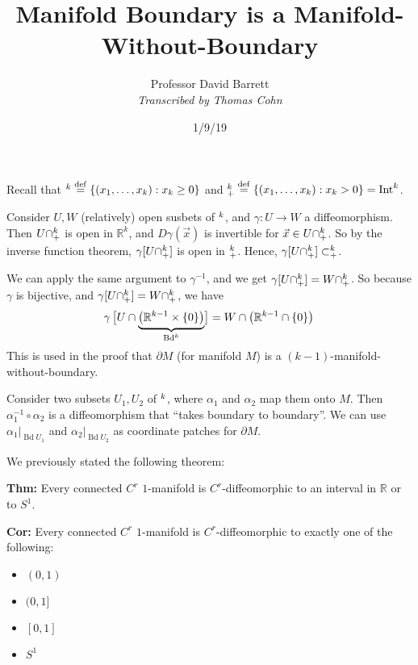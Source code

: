 \documentclass[10pt,letterpaper]{article}
\author{Professor David Barrett\\ \small\textit{Transcribed by Thomas Cohn}}
\title{Manifold Boundary is a Manifold-Without-Boundary}
\date{1/9/19} %
\newcommand{\n}{\hfill\break}
\newcommand{\thm}[1]{\par\noindent\settowidth{\hangindent}{\textbf{Thm: }}\textbf{Thm: }#1\n}
\newcommand{\cor}[1]{\par\noindent\settowidth{\hangindent}{\textbf{Cor: }}\textbf{Cor: }#1\n}
\newcommand{\ptxt}[1]{\textrm{\textnormal{#1}}}
\newcommand{\set}[1]{\left\{#1\right\}}
\newcommand{\reals}{\mathbb{R}}
\newcommand{\R}{\reals}
\newcommand{\halfPlane}{\mathbb{H}}
\let\H\relax
\newcommand{\H}{\halfPlane}
\newcommand{\inv}{^{-1}}
\newcommand{\of}{\circ}
\DeclareMathOperator{\Int}{Int}
\DeclareMathOperator{\Bd}{Bd}
\newcommand{\eqdef}{\overset{\ptxt{def}}{=}}
\newcommand{\paren}[1]{\left(#1\right)}
\renewcommand{\brack}[1]{\left[#1\right]}
\begin{document}
\maketitle
\setlength\RaggedRightParindent{\parindent}
\RaggedRight

\par\noindent Recall that $\H^{k}\eqdef\set{(x_{1},\ldots,x_{k}):x_{k}\ge{}0}$ and $\H^{k}_{+}\eqdef\set{(x_{1},\ldots,x_{k}):x_{k}>0}=\Int\H^{k}$.\n

\par\noindent Consider $U,W$ (relatively) open susbets of $\H^{k}$, and $\gamma:U\to{}W$ a diffeomorphism.\n
Then $U\cap\H^{k}_{+}$ is open in $\R^{k}$, and $D\gamma(\vec{x})$ is invertible for $\vec{x}\in{}U\cap\H^{k}_{+}$.\n
So by the inverse function theorem, $\gamma[U\cap\H^{k}_{+}]$ is open in $\H^{k}_{+}$. Hence, $\gamma[U\cap\H^{k}_{+}]\subset\H^{k}_{+}$.\n

\par\noindent We can apply the same argument to $\gamma\inv$, and we get $\gamma[U\cap\H^{k}_{+}]=W\cap\H^{k}_{+}$. So because $\gamma$ is bijective, and $\gamma[U\cap\H^{k}_{+}]=W\cap\H^{k}_{+}$, we have
\[
\gamma\brack{\vphantom{\paren{\R^{k-1}}}U\cap\smash{\underbrace{\paren{\R^{k-1}\times\set{0}}}_{\Bd\H^{k}}}}=W\cap\paren{\R^{k-1}\cap\set{0}}
\vphantom{\underbrace{A}_{B}}
\]

\par\noindent This is used in the proof that $\partial{}M$ (for manifold $M$) is a $(k-1)$-manifold-without-boundary.\n

\par\noindent Consider two subsets $U_{1},U_{2}$ of $\H^{k}$, where $\alpha_{1}$ and $\alpha_{2}$ map them onto $M$. Then $\alpha_{1}\inv\of\alpha_{2}$ is a diffeomorphism that ``takes boundary to boundary''. We can use $\alpha_{1}|_{\Bd{}U_{1}}$ and $\alpha_{2}|_{\Bd{}U_{2}}$ as coordinate patches for $\partial{}M$.\n

\par\noindent We previously stated the following theorem:\n
\thm{Every connected $C^{r}$ $1$-manifold is $C^{r}$-diffeomorphic to an interval in $\R$ or to $S^{1}$.}
\cor{Every connected $C^{r}$ $1$-manifold is $C^{r}$-diffeomorphic to exactly one of the following:
\begin{itemize}
	\item $(0,1)$
	\item $(0,1]$
	\item $[0,1]$
	\item $S^{1}$
\end{itemize}}
\end{document}
